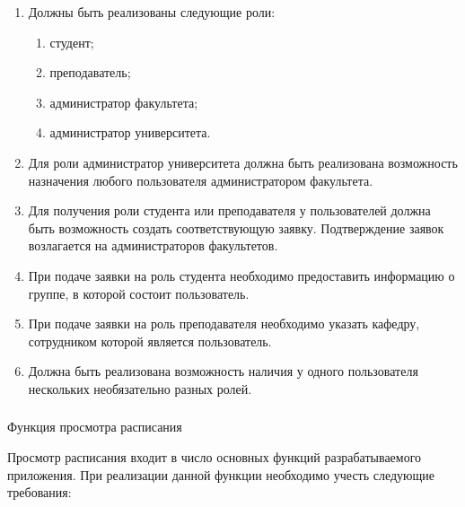\begin{enumerate}
	\item Должны быть реализованы следующие роли:
	\begin{enumerate}
		\item студент;
		\item преподаватель;
		\item администратор факультета;
		\item администратор университета.
	\end{enumerate}
	\item Для роли администратор университета должна быть реализована возможность назначения любого пользователя администратором факультета.
	\item Для получения роли студента или преподавателя у пользователей дол\-ж\-на быть возможность создать соответствующую заявку. Подтверждение заявок возлагается на администраторов факультетов.
	\item При подаче заявки на роль студента необходимо предоставить информацию о группе, в которой состоит пользователь.
	\item При подаче заявки на роль преподавателя необходимо указать кафедру, сотрудником которой является пользователь.
	\item Должна быть реализована возможность наличия у одного пользователя нескольких необязательно разных ролей.
\end{enumerate}

\subsubsection{} Функция просмотра расписания
\label{sec:domain:specification:agenda}

Просмотр расписания входит в число основных функций разрабатываемого приложения. При реализации данной функции необходимо учесть следующие требования:

